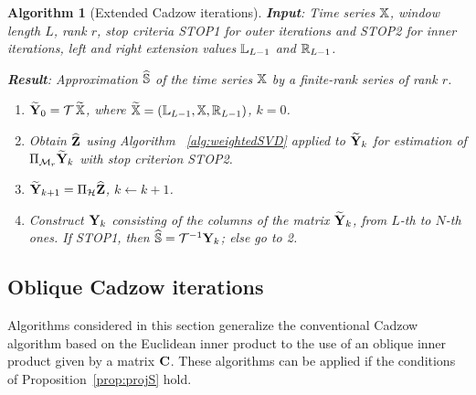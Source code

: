 \documentclass[sii]{ipart}
\newtheorem{algorithm}{Algorithm}
\newtheorem{remark}{Remark}
\begin{document}
\begin{algorithm}[Extended Cadzow iterations]\label{alg:ECIt}
	\textbf{Input}: Time series $\mathbb{X}$, window length $L$, rank $r$,
	stop criteria STOP1 for outer iterations and STOP2 for inner iterations,
	left and right extension values $\mathbb{L}_{L-1}$ and $\mathbb{R}_{L-1}$.
	
	\textbf{Result}:
	Approximation $\widehat{\mathbb{S}}$ of the time series $\mathbb{X}$ by a finite-rank series of rank $r$.
	
	\begin{enumerate}
		\item
		$\widetilde{\mathbf{Y}}_0 = \mathcal{T}\, \widetilde{\mathbb{X}}$, where $\widetilde{\mathbb{X}}=(\mathbb{L}_{L-1}, \mathbb{X}, \mathbb{R}_{L-1})$, $k=0$.
		\item
		Obtain $\widehat{\mathbf{Z}}$ using Algorithm ~\ref{alg:weightedSVD} applied to $\widetilde{\mathbf{Y}}_k$ for estimation of $\Pi_{\mathcal{M}_r} \widetilde{\mathbf{Y}}_{k}$ with stop criterion STOP2.
		\item
		$\widetilde{\mathbf{Y}}_{k+1} = \Pi_{\mathcal{H}}  \widehat{\mathbf{Z}}$, $k\leftarrow k+1$.
		\item
		Construct $\mathbf{Y}_k$ consisting of the columns of the matrix $\widetilde{\mathbf{Y}}_{k}$, from $L$-th to $N$-th ones. If STOP1, then $\widehat{\mathbb{S}} = \mathcal{T}^{-1} \mathbf{Y}_k$; else go to 2.
	\end{enumerate}
\end{algorithm}


\subsection{Oblique Cadzow iterations}
\label{sec:ObliqueCadzow}
Algorithms considered in this section generalize the conventional Cadzow algorithm based on the Euclidean inner product to the use of an oblique inner product given by a matrix $\mathbf{C}$.
These algorithms can be applied if the conditions of Proposition~\ref{prop:projS} hold.
\end{document}
